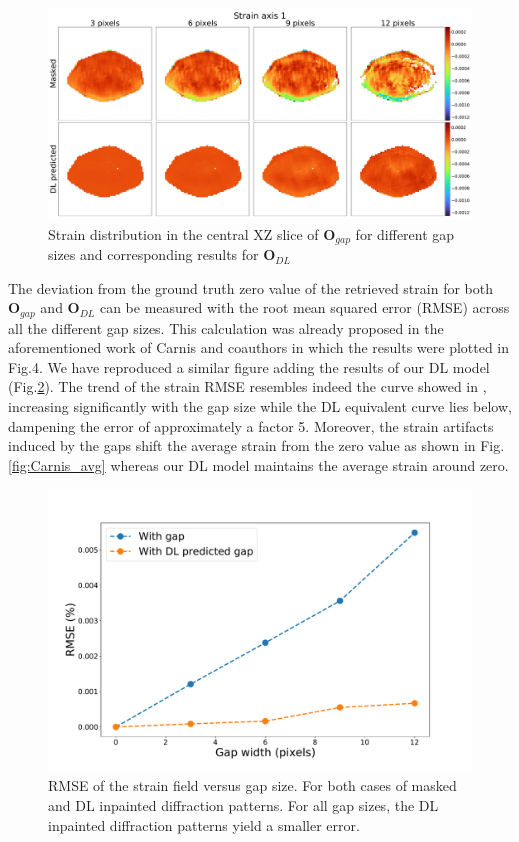 \begin{figure}[ht]
    \centering
    \includegraphics[width=\textwidth]{figures/Inpainting/strain_comparison_allGaps.pdf}
    \caption{Strain distribution in the central XZ slice of $\textbf{O}_{gap}$ for different gap sizes and 
    corresponding results for $\textbf{O}_{DL}$}
    \label{fig:Carnis_allgaps_strain}
\end{figure}

The deviation from the ground truth zero value of the retrieved strain for both $\textbf{O}_{gap}$ and $\textbf{O}_{DL}$
can be measured with the root mean squared error (RMSE) across all the different gap sizes. This calculation was already
proposed in the aforementioned work of Carnis and coauthors in which the results were plotted in Fig.4. We have reproduced
a similar figure adding the results of our DL model (Fig.\ref{fig:Carnis_std}). The trend of the strain RMSE 
resembles indeed the curve showed in \cite{carnis_towards_2019}, increasing significantly with the gap size 
while the DL equivalent curve lies below, dampening the error of approximately a factor 5. Moreover, the strain artifacts
induced by the gaps shift the average strain from the zero value as shown in Fig.\ref{fig:Carnis_avg} whereas our DL model 
maintains the average strain around zero.


\begin{figure}[ht]
    \centering
    \includegraphics[width=\textwidth]{figures/Inpainting/std_strain_comparison.pdf}
    \caption{RMSE of the strain field versus gap size. For both cases of masked and DL inpainted diffraction
    patterns. For all gap sizes, the DL inpainted diffraction patterns yield a smaller error.
    }
    \label{fig:Carnis_std}
\end{figure}

